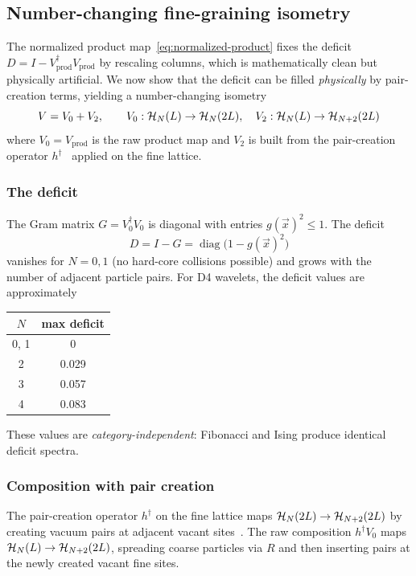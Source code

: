 \subsection{Number-changing fine-graining isometry}
\label{sec:number-changing}

The normalized product map~\eqref{eq:normalized-product} fixes the deficit $D = I - V_{\mathrm{prod}}^\dagger V_{\mathrm{prod}}$ by rescaling columns, which is mathematically clean but physically artificial. We now show that the deficit can be filled \emph{physically} by pair-creation terms, yielding a number-changing isometry
\begin{equation}
\label{eq:number-changing}
    V = V_0 + V_2, \qquad V_0: \mathcal{H}_N(L) \to \mathcal{H}_N(2L), \quad V_2: \mathcal{H}_N(L) \to \mathcal{H}_{N+2}(2L)
\end{equation}
where $V_0 = V_{\mathrm{prod}}$ is the raw product map and $V_2$ is built from the pair-creation operator $h^\dagger$~\cite{GarjaniArdonne2016} applied on the fine lattice.

\subsubsection{The deficit}

The Gram matrix $G = V_0^\dagger V_0$ is diagonal with entries $g(\vec{x})^2 \le 1$. The deficit
\begin{equation}
    D = I - G = \operatorname{diag}\bigl(1 - g(\vec{x})^2\bigr)
\end{equation}
vanishes for $N = 0, 1$ (no hard-core collisions possible) and grows with the number of adjacent particle pairs. For D4 wavelets, the deficit values are approximately
\begin{center}
\begin{tabular}{cc}
$N$ & max deficit \\
\hline
0, 1 & 0 \\
2 & 0.029 \\
3 & 0.057 \\
4 & 0.083
\end{tabular}
\end{center}
These values are \emph{category-independent}: Fibonacci and Ising produce identical deficit spectra.

\subsubsection{Composition with pair creation}

The pair-creation operator $h^\dagger$ on the fine lattice maps $\mathcal{H}_N(2L) \to \mathcal{H}_{N+2}(2L)$ by creating vacuum pairs at adjacent vacant sites~\cite{GarjaniArdonne2016}. The raw composition $h^\dagger V_0$ maps $\mathcal{H}_N(L) \to \mathcal{H}_{N+2}(2L)$, spreading coarse particles via $R$ and then inserting pairs at the newly created vacant fine sites.

